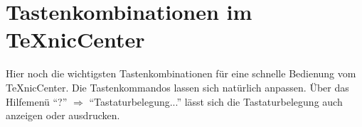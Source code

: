 %
%

\chapter{Tastenkombinationen im TeXnicCenter}

Hier noch die wichtigsten Tastenkombinationen für eine schnelle Bedienung vom TeXnicCenter. Die Tastenkommandos lassen sich natürlich anpassen. Über das Hilfemenü \enquote{?} $\Rightarrow$ \enquote{Tastaturbelegung...} lässt sich die Tastaturbelegung auch anzeigen oder ausdrucken. 

